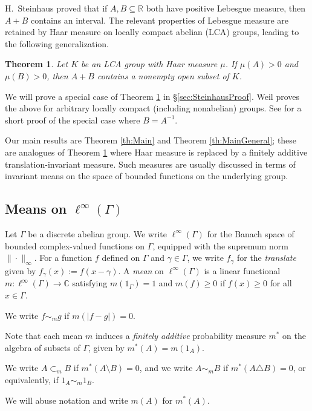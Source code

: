 \documentclass[12pt]{amsart} \usepackage{amsmath,centernot,amssymb,leftindex}
\newtheorem{theorem}{Theorem}
\numberwithin{theorem}{section}
\numberwithin{equation}{section}
\theoremstyle{definition}
\begin{document}
	H.~Steinhaus \cite[Th{\'e}or\`eme VII]{Steinhaus_SurLesDistances} proved that if $A, B\subseteq \mathbb R$ both have positive Lebesgue measure, then $A+B$ contains an interval.  The relevant properties of Lebesgue measure are  retained by Haar measure on locally compact abelian (LCA) groups, leading to the following generalization.  
	\begin{theorem}\label{th:SteinhausGeneral}
		Let $K$ be an LCA group with Haar measure $\mu$.  If $\mu(A)>0$ and $\mu(B)>0$, then $A+B$ contains a nonempty open subset of $K$.
	\end{theorem}
We will prove a special case of Theorem \ref{th:SteinhausGeneral} in \S\ref{sec:SteinhausProof}. Weil \cite[p.50]{Weil2ndEd} proves the above for arbitrary locally compact (including nonabelian) groups.   See \cite{Stromberg} for a short proof of the special case where $B=A^{-1}$.
	
	Our main results are Theorem  \ref{th:Main} and Theorem \ref{th:MainGeneral}; these are  analogues of  Theorem \ref{th:SteinhausGeneral} where Haar measure is replaced by a finitely additive translation-invariant measure.  Such measures are usually discussed in terms of invariant means on the space of bounded functions on the underlying group.
		\subsection{Means on \texorpdfstring{$\ell^{\infty}(\Gamma)$}{l infty Gamma}}  Let $\Gamma$ be a discrete abelian group. We write $\ell^{\infty}(\Gamma)$ for the Banach space of bounded complex-valued functions on $\Gamma$, equipped with the supremum norm $\|\cdot\|_{\infty}$.  For a function $f$ defined on $\Gamma$ and $\gamma \in \Gamma$, we write $f_\gamma$ for the \emph{translate} given by $f_\gamma(x):=f(x-\gamma)$.  A \emph{mean} on $\ell^\infty(\Gamma)$ is a linear functional $m:\ell^\infty(\Gamma)\to \mathbb C$ satisfying $m(1_\Gamma) = 1$ and
	$m(f)\geq 0$ if $f(x)\geq 0$ for all $x\in \Gamma$. 	
	
		We write $f\sim_{m} g$ if $m(|f-g|)=0$. 
	
	Note that each mean $m$ induces a \emph{finitely additive} probability measure $m^*$ on the algebra of subsets of $\Gamma$, given by $m^*(A)=m(1_A)$.  
	
	We write $A\subset_m B$ if $m^*(A\setminus B)=0$, and we write $A\sim_{m} B$ if $m^{*}(A\triangle B)=0$, or equivalently, if $1_{A} \sim_{m} 1_{B}$.  
	
	We will abuse notation and write $m(A)$ for $m^{*}(A)$.
	
\end{document}
